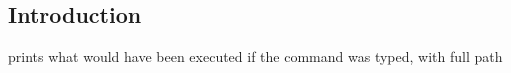 
\subsection{Introduction}

prints what would have been executed if the command was typed, with full path

